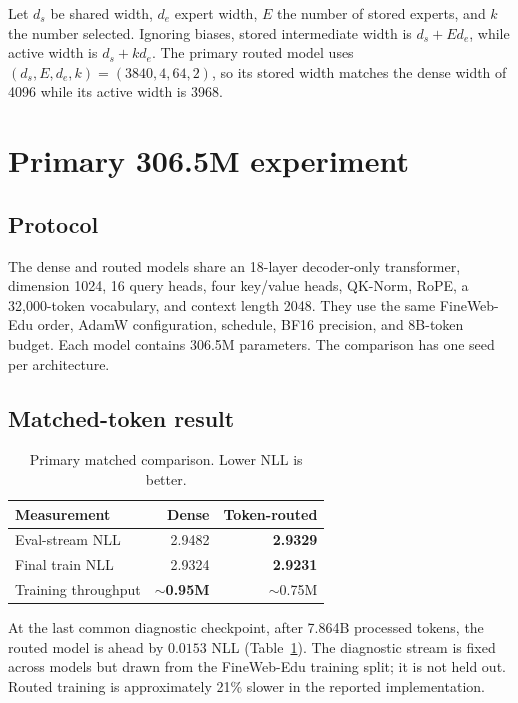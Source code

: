 \documentclass[10pt,twocolumn]{article}
\begin{document}
Let $d_s$ be shared width, $d_e$ expert width, $E$ the number of stored
experts, and $k$ the number selected. Ignoring biases, stored intermediate
width is $d_s+Ed_e$, while active width is $d_s+kd_e$. The primary routed model
uses $(d_s,E,d_e,k)=(3840,4,64,2)$, so its stored width matches the dense width
of 4096 while its active width is 3968.

\section{Primary 306.5M experiment}

\subsection{Protocol}

The dense and routed models share an 18-layer decoder-only transformer,
dimension 1024, 16 query heads, four key/value heads, QK-Norm, RoPE, a
32,000-token vocabulary, and context length 2048. They use the same
FineWeb-Edu order, AdamW configuration, schedule, BF16 precision, and 8B-token
budget. Each model contains 306.5M parameters. The comparison has one seed per
architecture.

\subsection{Matched-token result}

\begin{table}[t]
\centering
\small
\caption{Primary matched comparison. Lower NLL is better.}
\label{tab:primary}
\begin{tabular}{lrr}
\toprule
Measurement & Dense & Token-routed \\
\midrule
Eval-stream NLL & 2.9482 & \textbf{2.9329} \\
Final train NLL & 2.9324 & \textbf{2.9231} \\
Training throughput & \textbf{$\sim$0.95M} & $\sim$0.75M \\
\bottomrule
\end{tabular}
\end{table}

At the last common diagnostic checkpoint, after 7.864B processed tokens, the
routed model is ahead by $0.0153$ NLL (Table~\ref{tab:primary}). The diagnostic
stream is fixed across models but drawn from the FineWeb-Edu training split;
it is not held out. Routed training is approximately 21\% slower in the
reported implementation.
\end{document}
